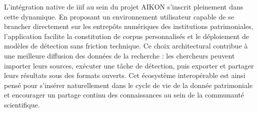 L'intégration native de \gls{iiif} au sein du projet AIKON s'inscrit pleinement dans cette dynamique. En proposant un environnement utilisateur capable de se brancher directement sur les entrepôts numériques des institutions patrimoniales, l'application facilite la constitution de corpus personnalisés et le déploiement de modèles de détection sans friction technique. Ce choix architectural contribue à une meilleure diffusion des données de la recherche : les chercheurs peuvent importer leurs sources, exécuter une tâche de détection, puis exporter et partager leurs résultats sous des formats ouverts. Cet écosystème interopérable est ainsi pensé pour s'insérer naturellement dans le cycle de vie de la donnée patrimoniale et encourager un partage continu des connaissances au sein de la communauté scientifique.
